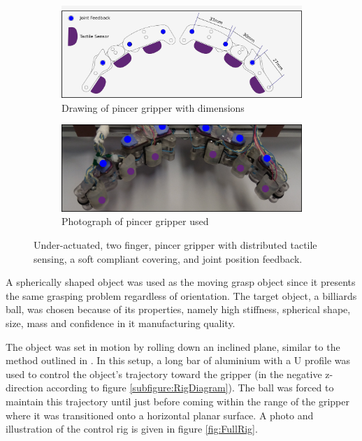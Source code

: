 \begin{figure}[ht]
    \centering
    \begin{subfigure}{.8\linewidth}
        \centering
        \includegraphics[width=\textwidth]{Images/Dimensions.png}
        \caption{Drawing of pincer gripper with dimensions}
        \label{subfig:1a}
    \end{subfigure}
    \begin{subfigure}{.8\linewidth}
        \centering
    \includegraphics[width=\textwidth]{Images/LabeledPhoto.png}
       \caption{Photograph of pincer gripper used}
        \label{subfig:1b}
    \end{subfigure}
 \caption{Under-actuated, two finger, pincer gripper with distributed tactile sensing, a soft compliant covering, and joint position feedback.}
\label{fig:Gripper}
\end{figure}

A spherically shaped object was used as the moving grasp object since it presents the same grasping problem regardless of orientation. The target object, a billiards ball, was chosen because of its properties, namely high stiffness, spherical shape, size, mass and confidence in it manufacturing quality.

The object was set in motion by rolling down an inclined plane, similar to the method outlined in \cite{DynamicObjectManipulation}. In this setup, a long bar of aluminium with a U profile was used to control the object's trajectory toward the gripper (in the negative z-direction according to figure \ref{subfigure:RigDiagram}). The ball was forced to maintain this trajectory until just before coming within the range of the gripper where it was transitioned onto a horizontal planar surface. A photo and illustration of the control rig is given in figure \ref{fig:FullRig}. 

